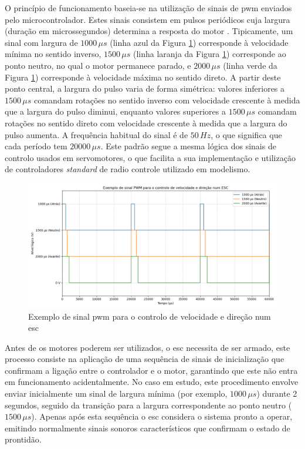 O princípio de funcionamento baseia-se na utilização de sinais de \gls{pwm} enviados pelo microcontrolador. Estes sinais consistem em pulsos periódicos cuja largura (duração em microssegundos) determina a resposta do motor \cite{didactic-robot-thesis}. Tipicamente, um sinal com largura de $1000\,\mu s$ (linha azul da Figura \ref{fig:pwm-sinal}) corresponde à velocidade mínima no sentido inverso, $1500\,\mu s$ (linha laranja da Figura \ref{fig:pwm-sinal}) corresponde ao ponto neutro, no qual o motor permanece parado, e $2000\,\mu s$ (linha verde da Figura \ref{fig:pwm-sinal}) corresponde à velocidade máxima no sentido direto. A partir deste ponto central, a largura do pulso varia de forma simétrica: valores inferiores a $1500\,\mu s$ comandam rotações no sentido inverso com velocidade crescente à medida que a largura do pulso diminui, enquanto valores superiores a $1500\,\mu s$ comandam rotações no sentido direto com velocidade crescente à medida que a largura do pulso aumenta. A frequência habitual do sinal é de $50\,Hz$, o que significa que cada período tem $20000\,\mu s$. Este padrão segue a mesma lógica dos sinais de controlo usados em servomotores, o que facilita a sua implementação e utilização de controladores \emph{standard} de radio controle utilizado em modelismo. 

\begin{figure}[H]
    \centering
    \includegraphics[width=1\linewidth]{figuras/pwm_us.png}
    \caption{Exemplo de sinal \gls{pwm} para o controlo de velocidade e direção num \gls{esc}}
    \label{fig:pwm-sinal}
\end{figure}

Antes de os motores poderem ser utilizados, o \gls{esc} necessita de ser armado, este processo consiste na aplicação de uma sequência de sinais de inicialização que confirmam a ligação entre o controlador e o motor, garantindo que este não entra em funcionamento acidentalmente. No caso em estudo, este procedimento envolve enviar inicialmente um sinal de largura mínima (por exemplo, $1000\,\mu s$) durante 2 segundos, seguido da transição para a largura correspondente ao ponto neutro ($1500\,\mu s$). Apenas após esta sequência o \gls{esc} considera o sistema pronto a operar, emitindo normalmente sinais sonoros característicos que confirmam o estado de prontidão.

